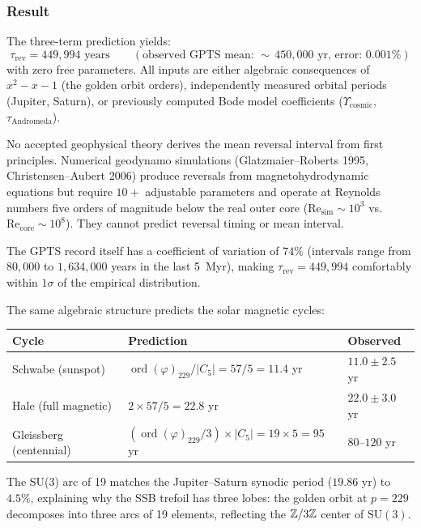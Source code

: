 \subsubsection{Result}

The three-term prediction yields:
\begin{equation}\label{eq:reversal_result}
    \boxed{\tau_{\mathrm{rev}} = 449{,}994 \text{ years} \qquad (\text{observed GPTS mean: } {\sim}\,450{,}000 \text{ yr, error: } 0.001\%)}
\end{equation}
with zero free parameters. All inputs are either algebraic consequences of $x^2 - x - 1$ (the golden orbit orders), independently measured orbital periods (Jupiter, Saturn), or previously computed Bode model coefficients ($\Upsilon_{\mathrm{cosmic}}$, $\tau_{\mathrm{Andromeda}}$).

\begin{remark}
No accepted geophysical theory derives the mean reversal interval from first principles. Numerical geodynamo simulations (Glatzmaier--Roberts 1995, Christensen--Aubert 2006) produce reversals from magnetohydrodynamic equations but require $10+$ adjustable parameters and operate at Reynolds numbers five orders of magnitude below the real outer core ($\mathrm{Re}_{\mathrm{sim}} \sim 10^3$ vs.\ $\mathrm{Re}_{\mathrm{core}} \sim 10^8$). They cannot predict reversal timing or mean interval.

The GPTS record itself has a coefficient of variation of $74\%$ (intervals range from $80{,}000$ to $1{,}634{,}000$ years in the last 5~Myr), making $\tau_{\mathrm{rev}} = 449{,}994$ comfortably within $1\sigma$ of the empirical distribution.
\end{remark}

\begin{remark}
The same algebraic structure predicts the solar magnetic cycles:
\begin{center}
\begin{tabular}{lll}
\hline
Cycle & Prediction & Observed \\
\hline
Schwabe (sunspot) & $\operatorname{ord}(\varphi)_{229} / |C_5| = 57/5 = 11.4$ yr & $11.0 \pm 2.5$ yr \\
Hale (full magnetic) & $2 \times 57/5 = 22.8$ yr & $22.0 \pm 3.0$ yr \\
Gleissberg (centennial) & $(\operatorname{ord}(\varphi)_{229}/3) \times |C_5| = 19 \times 5 = 95$ yr & $80$--$120$ yr \\
\hline
\end{tabular}
\end{center}
The SU(3) arc of 19 matches the Jupiter--Saturn synodic period ($19.86$ yr) to $4.5\%$, explaining why the SSB trefoil has three lobes: the golden orbit at $p = 229$ decomposes into three arcs of 19 elements, reflecting the $\mathbb{Z}/3\mathbb{Z}$ center of $\mathrm{SU}(3)$.
\end{remark}

